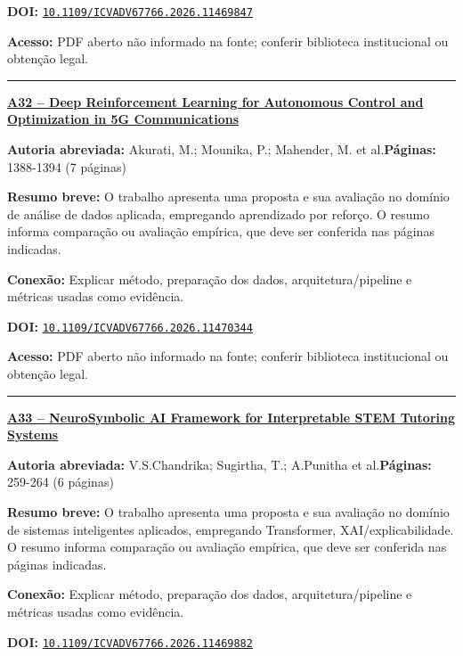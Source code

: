 \documentclass[10pt,a4paper]{article}
\begin{document}
\textbf{DOI:} \href{https://doi.org/10.1109/ICVADV67766.2026.11469847}{\nolinkurl{10.1109/ICVADV67766.2026.11469847}}\par
\textbf{Acesso:} PDF aberto não informado na fonte; conferir biblioteca institucional ou obtenção legal.\par
\noindent\rule{\textwidth}{0.35pt}
\par\medskip\noindent
{\large\bfseries\href{https://doi.org/10.1109/ICVADV67766.2026.11470344}{A32 -- Deep Reinforcement Learning for Autonomous Control and Optimization in 5G Communications}}\par\smallskip
\textbf{Autoria abreviada:} Akurati, M.; Mounika, P.; Mahender, M. et al.\quad \textbf{Páginas:} 1388-1394 (7 páginas)\par
\textbf{Resumo breve:} O trabalho apresenta uma proposta e sua avaliação no domínio de análise de dados aplicada, empregando aprendizado por reforço. O resumo informa comparação ou avaliação empírica, que deve ser conferida nas páginas indicadas.\par
\textbf{Conexão:} Explicar método, preparação dos dados, arquitetura/pipeline e métricas usadas como evidência.\par
\textbf{DOI:} \href{https://doi.org/10.1109/ICVADV67766.2026.11470344}{\nolinkurl{10.1109/ICVADV67766.2026.11470344}}\par
\textbf{Acesso:} PDF aberto não informado na fonte; conferir biblioteca institucional ou obtenção legal.\par
\noindent\rule{\textwidth}{0.35pt}
\par\medskip\noindent
{\large\bfseries\href{https://doi.org/10.1109/ICVADV67766.2026.11469882}{A33 -- NeuroSymbolic AI Framework for Interpretable STEM Tutoring Systems}}\par\smallskip
\textbf{Autoria abreviada:} V.S.Chandrika; Sugirtha, T.; A.Punitha et al.\quad \textbf{Páginas:} 259-264 (6 páginas)\par
\textbf{Resumo breve:} O trabalho apresenta uma proposta e sua avaliação no domínio de sistemas inteligentes aplicados, empregando Transformer, XAI/explicabilidade. O resumo informa comparação ou avaliação empírica, que deve ser conferida nas páginas indicadas.\par
\textbf{Conexão:} Explicar método, preparação dos dados, arquitetura/pipeline e métricas usadas como evidência.\par
\textbf{DOI:} \href{https://doi.org/10.1109/ICVADV67766.2026.11469882}{\nolinkurl{10.1109/ICVADV67766.2026.11469882}}\par
\end{document}

